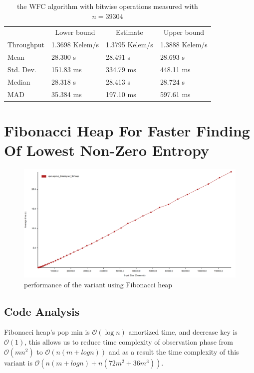 \documentclass[shortabstract, english, inz]{iithesis}
\begin{document}
\begin{table}[]
\begin{tabular}{llll}
\multicolumn{1}{c}{} & \multicolumn{1}{c}{Lower bound} & \multicolumn{1}{c}{Estimate} & \multicolumn{1}{c}{Upper bound} \\
Throughput           &   1.3698 Kelem/s                  & 1.3795 Kelem/s               & 1.3888 Kelem/s                  \\
Mean                 &  28.300 s                        & 28.491 s                     & 28.693 s                        \\
Std. Dev.            & 151.83 ms                       & 334.79 ms                    & 448.11 ms                       \\
Median               &  28.318 s                        & 28.413 s                     & 28.724 s                        \\
MAD                  &  35.384 ms                       & 197.10 ms                    & 597.61 ms
\end{tabular}
\caption{the WFC algorithm with bitwise operations measured with \(n = 39304\)}
\label{table:bitwise}
\end{table}



\section{Fibonacci Heap For Faster Finding Of Lowest Non-Zero Entropy}
\begin{figure}[H]
\centering
\includegraphics[width=1\textwidth, angle=0]{images/fibheap_performance.png}
\caption{performance of the variant using Fibonacci heap}
\label{fig:queue_bitarrayset_fibheap_performance}
\end{figure}
\label{fibheap}
\subsection{Code Analysis}
Fibonacci heap's pop min is \(\mathcal{O}(\log n)\) amortized time, and decrease key is \(\mathcal{O}(1)\), this allows us to reduce time complexity of observation phase from \(\mathcal{O}(mn^2)\) to \(\mathcal{O}(n(m + log n))\) and as a result the time complexity of this variant is \(\mathcal{O}(n(m + log n) + n(72m^2 + 36m^3))\).
\end{document}
